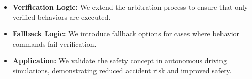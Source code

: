 \begin{itemize}
\item \textbf{Verification Logic:} We extend the arbitration process to ensure that only verified behaviors are executed.
\item \textbf{Fallback Logic:} We introduce fallback options for cases where behavior commands fail verification.
\item \textbf{Application:} We validate the safety concept in autonomous driving simulations, demonstrating reduced accident risk and improved safety.
\end{itemize}
